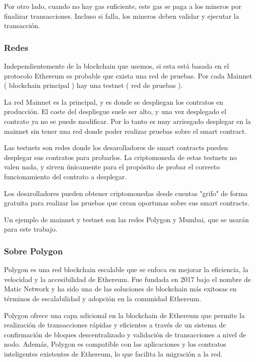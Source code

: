 Por otro lado, cuando no hay gas suficiente, este gas se paga a los mineros por finalizar transacciones. Incluso si falla, los mineros deben validar y ejecutar la transacción.

\subsubsection{Redes}

Independientemente de la blockchain que usemos, si esta está basada en el protocolo Ethereum es probable que exista una red de pruebas\cite{testnets}. Por cada Mainnet ( blockchain principal ) hay una testnet ( red de pruebas ).

\bigskip

La red Mainnet es la principal, y es donde se despliegan los contratos en producción. El coste del despliegue suele ser alto, y una vez desplegado el contrato ya no se puede modificar. Por lo tanto es muy arriesgado desplegar en la mainnet sin tener una red donde poder realizar pruebas sobre el smart contract.

\bigskip

Las testnets son redes donde los desarolladores de smart contracts pueden desplegar sus contratos para probarlos. La criptomoneda de estas testnets no valen nada, y sirven únicamente para el propósito de probar el correcto funcionamiento del contrato a desplegar.

\bigskip

Los desarolladores pueden obtener criptomonedas desde cuentas "grifo"\cite{faucet} de forma gratuita para realizar las pruebas que crean oportunas sobre sus smart contracts. 

\bigskip

Un ejemplo de mainnet y testnet son las redes Polygon y Mumbai, que se usarán para este trabajo.

\subsubsection{Sobre Polygon}

Polygon es una red blockchain escalable que se enfoca en mejorar la eficiencia, la velocidad y la accesibilidad de Ethereum. Fue fundada en 2017 bajo el nombre de Matic Network y ha sido una de las soluciones de blockchain más exitosas en términos de escalabilidad y adopción en la comunidad Ethereum.

\bigskip

Polygon ofrece una capa adicional en la blockchain de Ethereum que permite la realización de transacciones rápidas y eficientes a través de un sistema de confirmación de bloques descentralizado y validación de transacciones a nivel de nodo. Además, Polygon es compatible con las aplicaciones y los contratos inteligentes existentes de Ethereum, lo que facilita la migración a la red.

